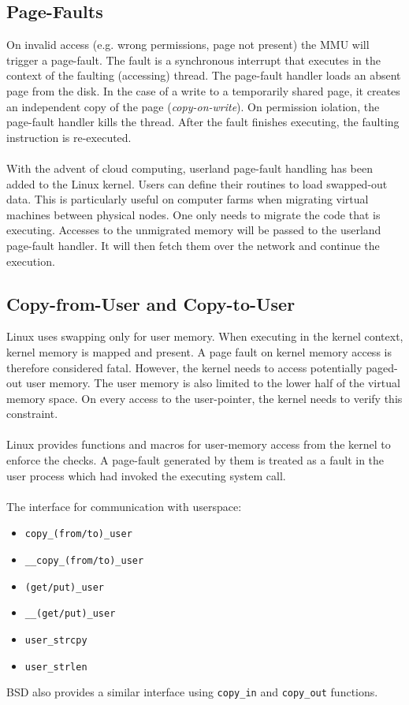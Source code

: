 \subsection{Page-Faults}
On invalid access (e.g. wrong permissions, page not present) the MMU will 
trigger a page-fault. The fault is a synchronous interrupt that executes in the 
context of the faulting (accessing) thread. The page-fault handler loads an 
absent page from the disk. In the case of a write to a temporarily shared page,
it creates an independent copy of the page (\emph{copy-on-write}). On permission
iolation, the page-fault handler kills the thread. After the fault finishes
executing, the faulting instruction is re-executed. 
\\
\\
With the advent of cloud computing, userland page-fault handling has been added 
to the Linux kernel. Users can define their routines to load swapped-out data.
This is particularly useful on computer farms when migrating virtual machines
between physical nodes. One only needs to migrate the code that is executing.
Accesses to the unmigrated memory will be passed to the userland page-fault
handler. It will then fetch them over the network and continue the execution.

\subsection{Copy-from-User and Copy-to-User}
Linux uses swapping only for user memory. When executing in the kernel context,
kernel memory is mapped and present. A page fault on kernel memory access is
therefore considered fatal. However, the kernel needs to access potentially
paged-out user memory. The user memory is also limited to the lower half of the
virtual memory space. On every access to the user-pointer, the kernel needs to
verify this constraint.
\\
\\
Linux provides functions and macros for user-memory access from the kernel to 
enforce the checks. A page-fault generated by them is treated as a fault in the
user process which had invoked the executing system call.
\\
\\
The interface for communication with userspace:
\begin{itemize}
    \item[] \texttt{copy\_(from/to)\_user}
    \item[] \texttt{\_\_copy\_(from/to)\_user}
    \item[] \texttt{(get/put)\_user}
    \item[] \texttt{\_\_(get/put)\_user}
    \item[] \texttt{user\_strcpy}
    \item[] \texttt{user\_strlen}
\end{itemize}
\bigskip
BSD also provides a similar interface using \texttt{copy\_in} and \texttt{copy\_out} functions.

